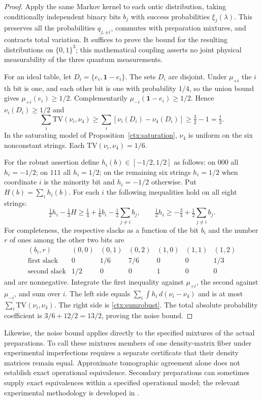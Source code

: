 \documentclass[11pt,a4paper]{article}
\theoremstyle{definition}
\theoremstyle{remark}\newtheorem{remark}[theorem]{Remark}
\newcommand{\TV}{\mathrm{TV}}
\begin{document}
\begin{proof}
Apply the same Markov kernel to each ontic distribution, taking
conditionally independent binary bits $b_j$ with success probabilities
$\xi_j(\lambda)$. This preserves all the probabilities $q_{j,\pm i}$,
commutes with preparation mixtures, and contracts total variation.
It suffices to prove the bound for the resulting distributions on
$\{0,1\}^3$; this mathematical coupling asserts no joint physical
measurability of the three quantum measurements.

For an ideal table, let $D_i=\{e_i,\mathbf1-e_i\}$. The sets $D_i$
are disjoint. Under $\mu_{+i}$ the $i$th bit is one, and each other bit
is one with probability $1/4$, so the union bound gives
$\mu_{+i}(e_i)\ge1/2$. Complementarily
$\mu_{-i}(\mathbf1-e_i)\ge1/2$. Hence $\nu_i(D_i)\ge1/2$ and
\[
 \sum_i\TV(\nu_i,\nu_4)
 \ge\sum_i[\nu_i(D_i)-\nu_4(D_i)]\ge\tfrac32-1=\tfrac12.
\]
In the saturating model of Proposition~\ref{ctx:saturation}, $\nu_4$
is uniform on the six nonconstant strings. Each $\TV(\nu_i,\nu_4)=1/6$.

For the robust assertion define $h_i(b)\in[-1/2,1/2]$ as follows:
on $000$ all $h_i=-1/2$; on $111$ all $h_i=1/2$; on the remaining
six strings $h_i=1/2$ when coordinate $i$ is the minority bit and
$h_i=-1/2$ otherwise. Put $H(b)=\sum_ih_i(b)$. For each $i$ the
following inequalities hold on all eight strings:
\[
 \tfrac12h_i-\tfrac13H\ge
 \tfrac14+\tfrac16b_i-\tfrac12\sum_{j\ne i}b_j,
 \qquad
 \tfrac12h_i\ge-\tfrac34+\tfrac12\sum_{j\ne i}b_j.
\]
For completeness, the respective slacks as a function of the bit
$b_i$ and the number $r$ of ones among the other two bits are
\[
\begin{array}{c|rrrrrr}
(b_i,r)&(0,0)&(0,1)&(0,2)&(1,0)&(1,1)&(1,2)\\\hline
\text{first slack}&0&1/6&7/6&0&0&1/3\\
\text{second slack}&1/2&0&0&1&0&0
\end{array}
\]
and are nonnegative. Integrate the first inequality against $\mu_{+i}$,
the second against $\mu_{-i}$, and sum over $i$. The left side equals
$\sum_i\int h_i\,d(\nu_i-\nu_4)$ and is at most
$\sum_i\TV(\nu_i,\nu_4)$. The right side is
\eqref{ctx:sumrobust}. The total absolute probability coefficient is
$3/6+12/2=13/2$, proving the noise bound.
\end{proof}

Likewise, the noise bound applies directly to the specified mixtures of
the actual preparations. To call these mixtures members of one
density-matrix fiber under experimental imperfections requires a separate
certificate that their density matrices remain equal. Approximate
tomographic agreement alone does not establish exact operational
equivalence. Secondary preparations can sometimes supply exact
equivalences within a specified operational model; the relevant experimental
methodology is developed in \cite{MPKRS16}.
\end{document}
